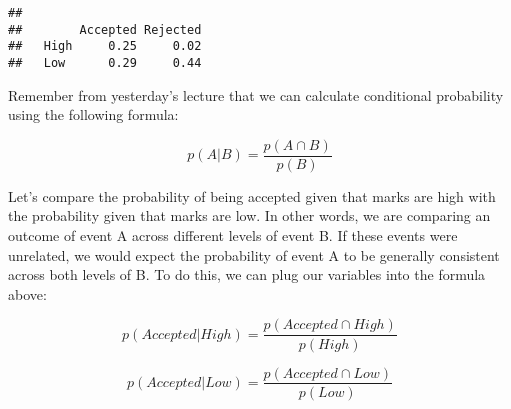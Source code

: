 \documentclass[
]{article}
\newenvironment{Shaded}{\begin{snugshade}}{\end{snugshade}}
\newcommand{\DecValTok}[1]{\textcolor[rgb]{0.00,0.00,0.81}{#1}}
\newcommand{\FunctionTok}[1]{\textcolor[rgb]{0.13,0.29,0.53}{\textbf{#1}}}
\newcommand{\NormalTok}[1]{#1}
\newcommand{\OtherTok}[1]{\textcolor[rgb]{0.56,0.35,0.01}{#1}}
\newcommand{\SpecialCharTok}[1]{\textcolor[rgb]{0.81,0.36,0.00}{\textbf{#1}}}
\newcommand{\StringTok}[1]{\textcolor[rgb]{0.31,0.60,0.02}{#1}}
\begin{document}
\begin{Shaded}
\end{Shaded}

\begin{verbatim}
##       
##        Accepted Rejected
##   High     0.25     0.02
##   Low      0.29     0.44
\end{verbatim}

Remember from yesterday's lecture that we can calculate conditional
probability using the following formula:

\[p(A|B) = \frac{p(A\cap B)}{p(B)}\]

Let's compare the probability of being accepted given that marks are
high with the probability given that marks are low. In other words, we
are comparing an outcome of event A across different levels of event B.
If these events were unrelated, we would expect the probability of event
A to be generally consistent across both levels of B. To do this, we can
plug our variables into the formula above:

\[p(Accepted|High) = \frac{p(Accepted\cap High)}{p(High)}\]

\[p(Accepted|Low) = \frac{p(Accepted\cap Low)}{p(Low)}\]
\end{document}

